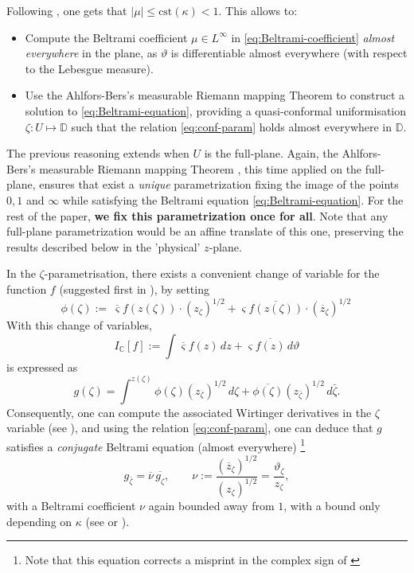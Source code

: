 \documentclass[reqno]{amsart}
\numberwithin{equation}{section}
\theoremstyle{definition}
\theoremstyle{remark}
\begin{document}
Following \cite[Equation (2.30)]{Che20}, one gets that $|\mu|\leq \text{cst}(\kappa) <1 $. This allows to:
\begin{itemize}
\item Compute the Beltrami coefficient $\mu \in L^{\infty}$ in \eqref{eq:Beltrami-coefficient} \emph{almost everywhere} in the plane, as $\vartheta$ is differentiable almost everywhere (with respect to the Lebesgue measure).
\item Use the Ahlfors-Bers's measurable Riemann mapping Theorem \cite[Chapter 5]{AIM} to construct a solution to \eqref{eq:Beltrami-equation}, providing a quasi-conformal uniformisation $\zeta:U\mapsto \mathbb{D} $ such that the relation \eqref{eq:conf-param} holds almost everywhere in $\mathbb{D}$.
\end{itemize}

The previous reasoning extends when $U$ is the full-plane. Again, the Ahlfors-Bers's measurable Riemann mapping Theorem \cite[Chapter 5]{AIM}, this time applied on the full-plane, ensures that exist a \emph{unique} parametrization fixing the image of the points $0,1$ and $\infty$ while satisfying the Beltrami equation \eqref{eq:Beltrami-equation}. For the rest of the paper, \textbf{we fix this parametrization once for all}. Note that any full-plane parametrization would be an affine translate of this one, preserving the results described below in the 'physical' $z$-plane.

In the $\zeta$-parametrisation, there exists a convenient change of variable for the function $f$ (suggested first in \cite[Equation (2.28)]{Che20}), by setting
\begin{equation}
\label{eq:f-to-phi-change}
\phi (\zeta) :=\ \overline{\varsigma}f(z(\zeta))\cdot (z_\zeta)^{1/2}+\varsigma\overline{f(z(\zeta))}\cdot (\overline{z}_\zeta)^{1/2}\,
\end{equation}
With this change of variables,
\[
I_{\mathbb C}[f]
:=\int \overline{\varsigma}f(z)\,dz
+\varsigma\overline{f(z)}\,d\vartheta
\]
is expressed as
\begin{equation}\label{eq:Ic-to-phi-change}
g(\zeta)
=
\int^{z(\zeta)}
\phi(\zeta)(z_\zeta)^{1/2}\,d\zeta
+
\overline{\phi(\zeta)}(z_{\bar\zeta})^{1/2}\,d\bar\zeta.
\end{equation}
Consequently, one can compute the associated Wirtinger derivatives in the $\zeta $ variable (see \cite[Proposition 2.21]{CLR2}), and using the relation \eqref{eq:conf-param}, one can deduce that $g$ satisfies a \emph{conjugate} Beltrami equation (almost everywhere) \footnote{Note that this equation corrects a misprint in the complex sign of  \cite[(2.26)]{Mah23}}
\begin{equation}\label{eq:g_beltrami}
g_{\bar\zeta}
=
\overline{\nu}\,\overline{g_\zeta},
\qquad
\nu
:=
\frac{(\overline z_\zeta)^{1/2}}{(z_\zeta)^{1/2}}
=
\frac{\vartheta_\zeta}{z_\zeta},
\end{equation}
with a Beltrami coefficient $\nu$ again bounded away from $1$, with a bound only depending on $\kappa $ (see \cite[Equation (2.30)]{Che20} or \cite[Proposition 2.21]{CLR2}). 
\end{document}
